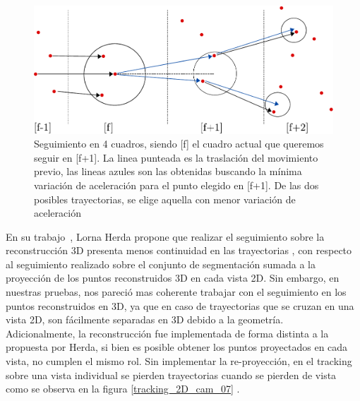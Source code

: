 \begin{figure}[hbt]
\begin{center}
\includegraphics[scale=0.8]{img/Tracking/tracking-eps-converted-to.pdf}
\end{center}
\caption{Seguimiento en 4 cuadros, siendo [f] el cuadro actual que queremos seguir en [f+1]. La linea punteada es la traslación del movimiento previo, las lineas azules son las obtenidas buscando la mínima variación de aceleración para el punto elegido en [f+1]. De las dos posibles trayectorias, se elige aquella con menor variación de aceleración}
\label{herda_00}
\end{figure}

En su trabajo~\cite{herda}, Lorna Herda propone que realizar el seguimiento sobre la reconstrucción 3D presenta menos continuidad en las trayectorias , con respecto al seguimiento realizado sobre el conjunto de segmentación sumada a la proyección de los puntos reconstruidos 3D en cada vista 2D. Sin embargo, en nuestras pruebas, nos pareció mas coherente trabajar con el seguimiento en los puntos reconstruidos en 3D, ya que en caso de trayectorias que se cruzan en una vista 2D, son fácilmente separadas en 3D debido a la geometría.
\\ 

Adicionalmente, la reconstrucción fue implementada de forma distinta a la propuesta por Herda, si bien es posible obtener los puntos proyectados en cada vista, no cumplen el mismo rol. Sin implementar la re-proyección, en el tracking sobre una vista individual se pierden trayectorias cuando se pierden de vista como se observa en la figura \ref{tracking_2D_cam_07} .

